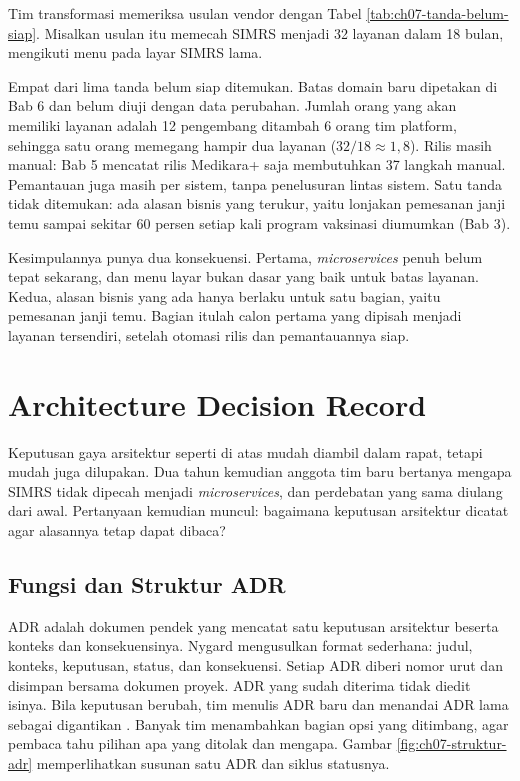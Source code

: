 \begin{kasus}[title={Kasus Medikara Health: Menimbang Usulan 32 Layanan}]
  Tim transformasi memeriksa usulan vendor dengan Tabel \ref{tab:ch07-tanda-belum-siap}. Misalkan
  usulan itu memecah SIMRS menjadi 32 layanan dalam 18 bulan, mengikuti menu pada layar SIMRS lama.

  Empat dari lima tanda belum siap ditemukan. Batas domain baru dipetakan di Bab 6 dan belum diuji
  dengan data perubahan. Jumlah orang yang akan memiliki layanan adalah 12 pengembang ditambah 6
  orang tim platform, sehingga satu orang memegang hampir dua layanan ($32/18 \approx 1{,}8$). Rilis
  masih manual: Bab 5 mencatat rilis Medikara+ saja membutuhkan 37 langkah manual. Pemantauan juga
  masih per sistem, tanpa penelusuran lintas sistem. Satu tanda tidak ditemukan: ada alasan bisnis
  yang terukur, yaitu lonjakan pemesanan janji temu sampai sekitar 60 persen setiap kali program
  vaksinasi diumumkan (Bab 3).

  Kesimpulannya punya dua konsekuensi. Pertama, \textit{microservices} penuh belum tepat sekarang,
  dan menu layar bukan dasar yang baik untuk batas layanan. Kedua, alasan bisnis yang ada hanya
  berlaku untuk satu bagian, yaitu pemesanan janji temu. Bagian itulah calon pertama yang dipisah
  menjadi layanan tersendiri, setelah otomasi rilis dan pemantauannya siap.
\end{kasus}

\section{Architecture Decision Record}
\label{sec:ch07-adr}

Keputusan gaya arsitektur seperti di atas mudah diambil dalam rapat, tetapi mudah juga dilupakan.
Dua tahun kemudian anggota tim baru bertanya mengapa SIMRS tidak dipecah menjadi
\textit{microservices}, dan perdebatan yang sama diulang dari awal. Pertanyaan kemudian muncul:
bagaimana keputusan arsitektur dicatat agar alasannya tetap dapat dibaca?

\subsection{Fungsi dan Struktur ADR}

ADR adalah dokumen pendek yang mencatat satu keputusan arsitektur beserta konteks dan
konsekuensinya. Nygard mengusulkan format sederhana: judul, konteks, keputusan, status, dan
konsekuensi. Setiap ADR diberi nomor urut dan disimpan bersama dokumen proyek. ADR yang sudah
diterima tidak diedit isinya. Bila keputusan berubah, tim menulis ADR baru dan menandai ADR lama
sebagai digantikan \cite{c07-nygard2011}. Banyak tim menambahkan bagian opsi yang ditimbang, agar
pembaca tahu pilihan apa yang ditolak dan mengapa. Gambar \ref{fig:ch07-struktur-adr} memperlihatkan
susunan satu ADR dan siklus statusnya.

